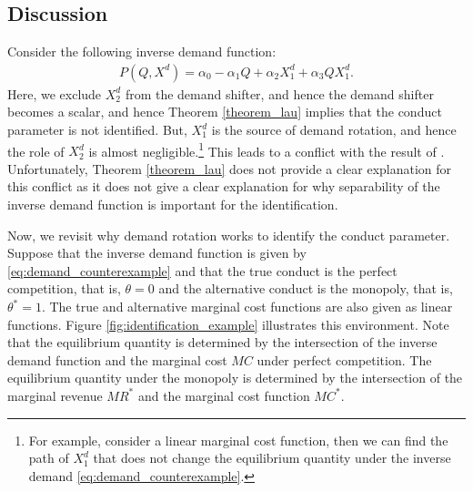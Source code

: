 \documentclass[11pt, a4paper]{article}
\theoremstyle{remark}
\begin{document}
\subsection{Discussion}
Consider the following inverse demand function:
\begin{align}
    P(Q, X^{d}) = \alpha_0 - \alpha_1Q + \alpha_2X^{d}_1 + \alpha_3QX^{d}_1. \label{eq:demand_counterexample}
\end{align}
Here, we exclude $X^{d}_2$ from the demand shifter, and hence the demand shifter becomes a scalar, and hence Theorem \ref{theorem_lau} implies that the conduct parameter is not identified.
But, $X^{d}_1$ is the source of demand rotation, and hence the role of $X^{d}_2$ is almost negligible.\footnote{For example, consider a linear marginal cost function, then we can find the path of $X^{d}_1$ that does not change the equilibrium quantity under the inverse demand \eqref{eq:demand_counterexample}.}
This leads to a conflict with the result of \citet{lau1982identifying}.
Unfortunately, Theorem \ref{theorem_lau} does not provide a clear explanation for this conflict as it does not give a clear explanation for why separability of the inverse demand function is important for the identification.

Now, we revisit why demand rotation works to identify the conduct parameter.
Suppose that the inverse demand function is given by \eqref{eq:demand_counterexample} and that the true conduct is the perfect competition, that is, $\theta = 0$ and the alternative conduct is the monopoly, that is, $\theta^{*} = 1$.
The true and alternative marginal cost functions are also given as linear functions.
Figure \ref{fig:identification_example} illustrates this environment.
Note that the equilibrium quantity is determined by the intersection of the inverse demand function and the marginal cost $MC$ under perfect competition.
The equilibrium quantity under the monopoly is determined by the intersection of the marginal revenue $MR^{*}$ and the marginal cost function $MC^{*}$.
\end{document}
